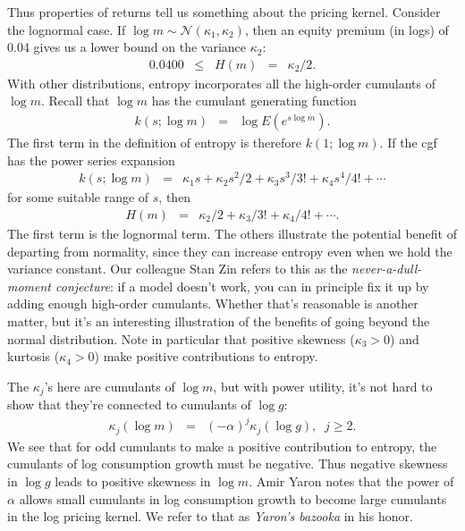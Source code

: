 \documentclass[11pt]{article}
\begin{document}
Thus properties of returns tell us something about the pricing kernel.
Consider the lognormal case.
If $\log m \sim \mathcal{N}(\kappa_1,\kappa_2)$, then an equity premium (in logs) of 0.04
gives us a lower bound on the variance $\kappa_2$:
\begin{eqnarray*}
    0.0400 \;\;\leq\;\; H(m) &=& \kappa_2/2.
\end{eqnarray*}
With other distributions, entropy incorporates all the high-order cumulants of $\log m$.
Recall that $\log m$ has the cumulant generating function
\begin{eqnarray*}
    k(s; \log m) &=& \log E \left( e^{s \log m} \right) .
\end{eqnarray*}
The first term in the definition of entropy is therefore $k(1; \log m)$.
If the cgf has the power series expansion
\begin{eqnarray*}
    k(s; \log m) &=& \kappa_1 s + \kappa_2 s^2/2 + \kappa_3 s^3 / 3! + \kappa_4 s^4/ 4! + \cdots
\end{eqnarray*}
for some suitable range of $s$,
then
\begin{eqnarray*}
    H(m)  &=& \kappa_2 /2 + \kappa_3 / 3! + \kappa_4 / 4! + \cdots .
\end{eqnarray*}
The first term is the lognormal term.
The others illustrate the potential benefit of departing from normality,
since they can increase entropy even when we hold the variance constant.
Our colleague Stan Zin refers to this as the {\it never-a-dull-moment conjecture\/}:
if a model doesn't work, you can in principle fix it up by adding enough
high-order cumulants.
Whether that's reasonable is another matter, but it's an interesting
illustration of the benefits of going beyond the normal distribution.
Note in particular that positive skewness ($\kappa_3 > 0$) and kurtosis ($\kappa_4 > 0$)
make positive contributions to entropy.


The $\kappa_j$'s here are cumulants of $\log m$,
but with power utility, it's not hard to show that they're connected to cumulants
of $\log g$:
\begin{eqnarray*}
    \kappa_j (\log m) &=& (-\alpha)^j  \kappa_j (\log g), \;\;  j\geq 2.
\end{eqnarray*}
We see that for odd cumulants to make a positive contribution to entropy,
the cumulants of log consumption growth must be negative.
Thus negative skewness in $\log g$ leads to positive skewness in $\log m$.
Amir Yaron notes that the power of $\alpha$ allows small cumulants in log consumption growth
to become large cumulants in the log pricing kernel.
We refer to that as {\it Yaron's bazooka\/} in his honor.
\end{document}
